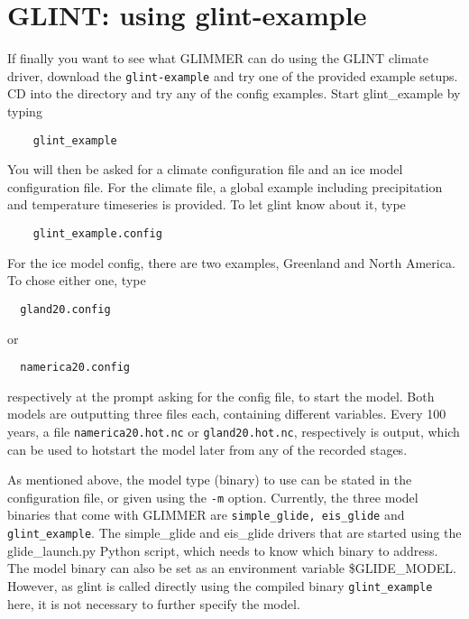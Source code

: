 \section{GLINT: using glint-example}
If finally you want to see what GLIMMER can do using the GLINT climate driver,
download the \texttt{glint-example} and try one of the provided example setups.
CD into the directory and try any of the config examples. Start glint\_example
by typing
\begin{verbatim}
    glint_example
\end{verbatim}
You will then be asked for a climate configuration file and an ice model 
configuration file.
For the climate file, a global example including precipitation and temperature timeseries
is provided. To let glint know about it, type
\begin{verbatim}
    glint_example.config
\end{verbatim}
For the ice model config, there are two examples, Greenland and North America. To chose either one, type
\begin{verbatim}
  gland20.config
\end{verbatim}
or
\begin{verbatim}
  namerica20.config
\end{verbatim}
respectively at the prompt asking for the config file, to start the model.
Both models are outputting three files each, containing different variables.
Every 100 years, a file \texttt{namerica20.hot.nc} or \texttt{gland20.hot.nc}, respectively is output, 
which can be used to hotstart the model later from any of the recorded stages.

As mentioned above, the model type (binary) to use can be stated in the configuration file,
or given using the \texttt{-m} option. Currently, the three model binaries that
come with GLIMMER are \texttt{simple\_glide, eis\_glide} and
\texttt{glint\_example}. The simple\_glide and eis\_glide drivers that are started using the glide\_launch.py Python script,
which needs to know which binary to address. The model binary can also be set as an environment variable \$GLIDE\_MODEL. 
However, as glint is called directly using the compiled binary \texttt{glint\_example} here, it is not necessary to further 
specify the model.


%


